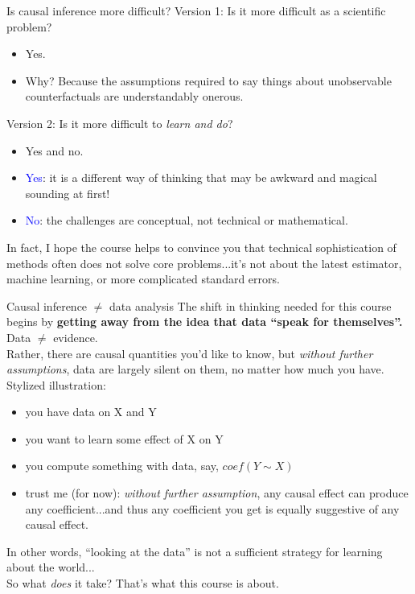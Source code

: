 \documentclass[handout,xcolor=dvipsnames,pdftex,hyperref={colorlinks=false}]{beamer}
\begin{document}
\begin{frame}{Is causal inference more difficult?}
 Version 1: Is it more difficult as a scientific problem?\\
\small
\begin{itemize}
\item Yes.
\item Why? Because the assumptions required to say things about unobservable counterfactuals are understandably onerous.
\end{itemize}
\medskip
\normalsize
{} Version 2: Is it more difficult to \textit{learn and do}?\\
\small
\begin{itemize}
\item Yes and no.
\item \textcolor{blue}{Yes}: it is a different way of thinking that may be awkward and magical sounding at first!
\item \textcolor{blue}{No}: the challenges are conceptual, not technical or mathematical.
\end{itemize}
\small
{} In fact, I hope the course helps to convince you that technical sophistication of methods often does not solve core problems...it's not about the latest estimator, machine learning, or more complicated standard errors.
\end{frame}


\begin{frame}{Causal inference $\neq$ data analysis}
\small
{} The shift in thinking needed for this course begins by \textbf{getting away from the idea that data ``speak for themselves''.} Data $\neq$ evidence. \\
\medskip
{} Rather, there are causal quantities you'd like to know, but \textit{without further assumptions}, data are largely silent on them, no matter how much you have. \\
\medskip
{}
Stylized illustration:
\begin{itemize}
\item you have data on X and Y
\item you want to learn some effect of X on Y
\item you compute something with data, say, $coef(Y\sim X)$
\item trust me (for now): \textit{without further assumption}, any causal effect can produce any coefficient...and thus any coefficient you get is equally suggestive of any causal effect.
\end{itemize}
 In other words, ``looking at the data'' is not a sufficient strategy for learning about the world... \\
\bigskip
{} So what \textit{does} it take? That's what this course is about.
\end{frame}
\end{document}
